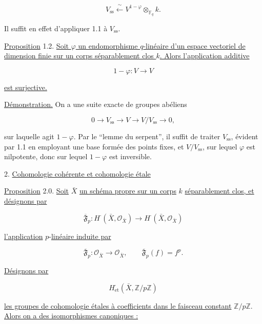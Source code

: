 \begin{equation}\tag{1.1.11}
V_{\mathrm{ss}}\xleftarrow{\ \sim\ }
V^{1-\varphi}\otimes_{\mathbb F_q}k.
\end{equation}

Il suffit en effet d'appliquer 1.1 à $V_{\mathrm{ss}}$.

\underline{Proposition} 1.2. \underline{Soit $\varphi$ un endomorphisme
$q$-linéaire d'un espace vectoriel de dimension finie sur un corps
séparablement clos $k$. Alors l'application additive}

\[
1-\varphi:V\longrightarrow V
\]

\underline{est surjective.}

\underline{Démonstration.} On a une suite exacte de groupes abéliens

\[
0\longrightarrow V_{\mathrm{ss}}\longrightarrow V
\longrightarrow V/V_{\mathrm{ss}}\longrightarrow0,
\]


sur laquelle agit $1-\varphi$. Par le ``lemme du serpent'', il suffit de
traiter $V_{\mathrm{ss}}$, évident par 1.1 en employant une base formée des
points fixes, et $V/V_{\mathrm{ss}}$, sur lequel $\varphi$ est nilpotente,
donc sur lequel $1-\varphi$ est inversible.

2. \underline{Cohomologie cohérente et cohomologie étale}

\underline{Proposition} 2.0. \underline{Soit} $\bar X$ \underline{un schéma propre sur
un corps} $k$ \underline{séparablement clos, et désignons par}

\begin{equation}\tag{2.0.1}
\overline{\mathfrak F}_p:H^{\cdot}(\bar X,\mathcal O_{\bar X})
\longrightarrow H^{\cdot}(\bar X,\mathcal O_{\bar X})
\end{equation}

\underline{l'application} $p$-\underline{linéaire induite par}

\begin{equation}\tag{2.0.2}
\overline{\mathfrak F}_p:\mathcal O_{\bar X}\longrightarrow\mathcal O_{\bar X},
\qquad \overline{\mathfrak F}_p(f)=f^p.
\end{equation}

\underline{Désignons par}

\[
H^{\cdot}_{\mathrm{et}}(\bar X,\mathbb Z/p\mathbb Z)
\]

\underline{les groupes de cohomologie étales à coefficients dans le faisceau
constant} $\mathbb Z/p\mathbb Z$. \underline{Alors on a des isomorphismes canoniques :}

